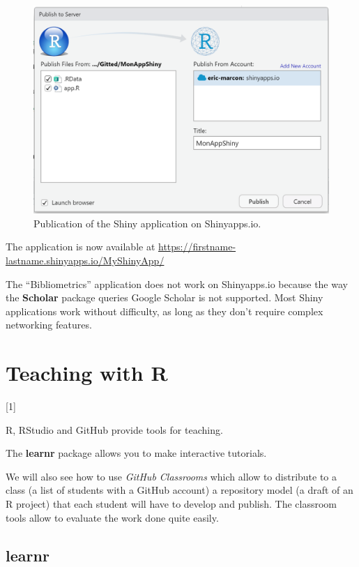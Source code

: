 \documentclass[
  12pt,
  american,
  a4paper,
  extrafontsizes,onecolumn,openright
  ]{memoir}
\newcommand{\toc}[1]{%
  \startcontents[chapters]%
  \printcontents[chapters]{}{1}[#1]{}%
  ~\newline%
}
\begin{document}
\scriptsize

\begin{figure}

{\centering \includegraphics[width=0.8\linewidth]{images/shiny-publish} 

}

\caption{Publication of the Shiny application on Shinyapps.io.}\label{fig:shiny-publish}
\end{figure}

\normalsize

The application is now available at \url{https://firstname-lastname.shinyapps.io/MyShinyApp/}

The \enquote{Bibliometrics} application does not work on Shinyapps.io because the way the \textbf{Scholar} package queries Google Scholar is not supported.
Most Shiny applications work without difficulty, as long as they don't require complex networking features.

\chapter{Teaching with R}\label{chap-enseigner}

\toc{1}

R, RStudio and GitHub provide tools for teaching.

The \textbf{learnr} package allows you to make interactive tutorials.

We will also see how to use \emph{GitHub Classrooms} which allow to distribute to a class (a list of students with a GitHub account) a repository model (a draft of an R project) that each student will have to develop and publish.
The classroom tools allow to evaluate the work done quite easily.

\section{learnr}\label{learnr}
\end{document}
